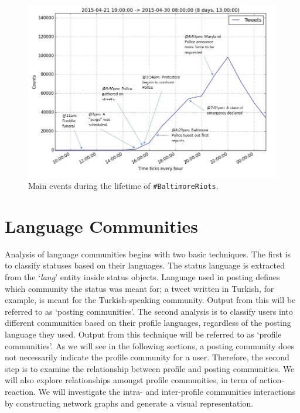 \documentclass[conference]{IEEEtran}
\begin{document}
\begin{figure}[!htb]
\centering
\includegraphics[width=\columnwidth]{images/mainevents.png}
\caption{Main events during the lifetime of {\texttt{\#BaltimoreRiots}}.}
\label{fig:mainevents}
\end{figure}


\section{Language Communities}\label{langcomm}

Analysis of language communities begins with two basic techniques. The
first is to classify statuses based on their languages. The status
language is extracted from the `{\emph{lang}}' entity inside status
objects. Language used in posting defines which community the status
was meant for; a tweet written in Turkish, for example, is meant for
the Turkish-speaking community. Output from this will be referred to
as `posting communities'. The second analysis is to classify users
into different communities based on their profile languages,
regardless of the posting language they used. Output from this
technique will be referred to as `profile communities'. As we will see
in the following sections, a posting community does not necessarily
indicate the profile community for a user. Therefore, the second step
is to examine the relationship between profile and posting
communities. We will also explore relationships amongst profile
communities, in term of action-reaction. We will investigate the
intra- and inter-profile communities interactions by constructing
network graphs and generate a visual representation.
\end{document}
